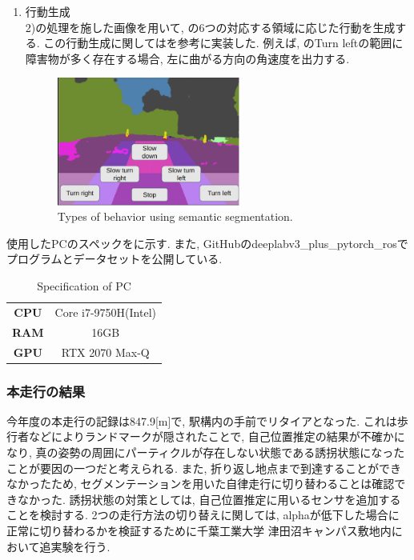 \documentclass[uplatex, twocolumn, 9pt]{jsproceedings}
\begin{document}
\begin{enumerate}
\begin{figure}[h]
    \label{fig:seg_runarea}%
  \end{figure}
  \item 行動生成\\
  2)の処理を施した画像を用いて, の6つの対応する領域に応じた行動を生成する. この行動生成に関しては\cite{meiji-thesis}を参考に実装した. 例えば, のTurn leftの範囲に障害物が多く存在する場合, 左に曲がる方向の角速度を出力する. 
  \begin{figure}[h]
    \centering
    \includegraphics[width=60mm]{fig/seg.pdf}
    \caption{Types of behavior using semantic segmentation.}
    \label{fig:seg}%
  \end{figure}
\end{enumerate}
使用したPCのスペックをに示す. また, GitHubのdeeplabv3\_plus\_pytorch\_ros\cite{DeeplabV3}でプログラムとデータセットを公開している.

\begin{table}[h]
  \centering
  \caption{Specification of PC}
  \label{table:pc}
  \begin{tabular}{cc}
  \toprule%
  \textbf{CPU} & Core i7-9750H(Intel)\\
  \textbf{RAM} & 16GB\\
  \textbf{GPU} & RTX 2070 Max-Q\\
  \bottomrule%
  \end{tabular}
\end{table}

\subsubsection{本走行の結果}
今年度の本走行の記録は847.9[m]で, 駅構内の手前でリタイアとなった. これは歩行者などによりランドマークが隠されたことで, 自己位置推定の結果が不確かになり, 真の姿勢の周囲にパーティクルが存在しない状態である誘拐状態\cite{emcl-thesis}になったことが要因の一つだと考えられる. また, 折り返し地点まで到達することができなかったため, セグメンテーションを用いた自律走行に切り替わることは確認できなかった. 誘拐状態の対策としては, 自己位置推定に用いるセンサを追加することを検討する. 2つの走行方法の切り替えに関しては, alphaが低下した場合に正常に切り替わるかを検証するために千葉工業大学 津田沼キャンパス敷地内において追実験を行う. 
\end{document}
